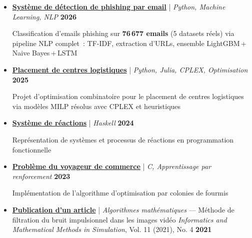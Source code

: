 \documentclass[10pt,english,french]{article}
\begin{document}
\vspace{-6pt}
\begin{itemize}[leftmargin=0.5cm, label=\textbullet, itemsep=0.2em]
    \item \href{https://github.com/DmytroPalahin/phishing-email-detection}{\textbf{Système de détection de phishing par email}} | \textit{Python, Machine Learning, NLP} \hfill \textbf{2026}

          Classification d'emails phishing sur \textbf{76\,677 emails} (5 datasets réels) via
          pipeline NLP complet~: TF-IDF, extraction d'URLs, ensemble LightGBM\,+\,Naive Bayes\,+\,LSTM

    \item \href{https://github.com/DmytroPalahin/logistics-center-placement}{\textbf{Placement de centres logistiques}} | \textit{Python, Julia, CPLEX, Optimisation} \hfill \textbf{2025}

          Projet d’optimisation combinatoire pour le placement de centres logistiques via
          modèles MILP résolus avec CPLEX et heuristiques

    \item \href{https://github.com/DmytroPalahin/hsReact}{\textbf{Système de réactions}} | \textit{Haskell} \hfill \textbf{2024}

          Représentation de systèmes et processus de réactions en programmation
          fonctionnelle

    \item \href{https://github.com/DmytroPalahin/Probleme_du_Voyageur_de_Commerce}{\textbf{Problème du voyageur de commerce}} | \textit{C, Apprentissage par renforcement} \hfill \textbf{2023}

          Implémentation de l'algorithme d'optimisation par colonies de fourmis

    \item \href{https://www.researchsquare.com/article/rs-2203260/v1}{\textbf{Publication d'un article}} | \textit{Algorithmes mathématiques} --- Méthode de filtration du bruit impulsionnel dans les images vidéo \textit{Informatics and Mathematical Methods in Simulation}, Vol. 11 (2021), No. 4 \hfill \textbf{2021}


\end{itemize}
\end{document}
